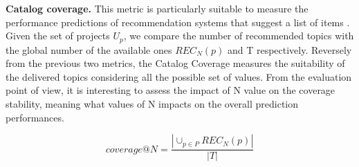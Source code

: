 \vspace{.1cm}
\vspace{.1cm}



\noindent \textbf{Catalog coverage.} This metric is particularly suitable to measure the performance predictions of recommendation systems that suggest a list of items \cite{ge_beyond_2010}. Given the set of projects $U_p$, we compare the number of recommended topics with the global number of the available ones \ie $ REC_{N}(p)$ and T respectively. Reversely from the previous two metrics, the Catalog Coverage measures the suitability of the delivered topics considering all the possible set of values. From the evaluation point of view, it is interesting to assess the impact of N value on the coverage stability, meaning what values of N impacts on the overall prediction performances. 



\begin{equation}\label{eqn:Coverage}
coverage@N = \frac{\left | \cup_{p\in P} REC_{N}(p) \right | }{\left | T \right |} 
\end{equation}

\vspace{.1cm}
\vspace{.1cm}





